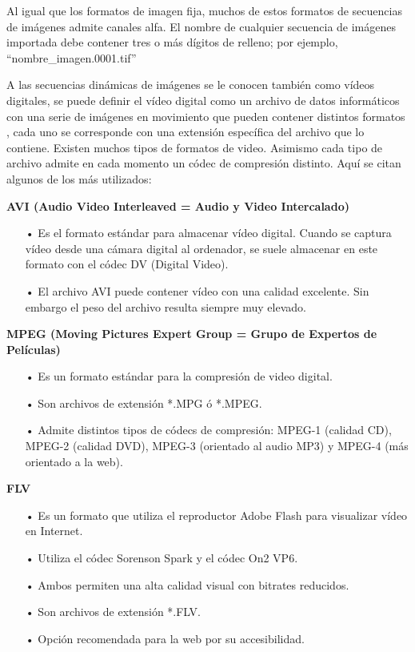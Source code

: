 Al igual que los formatos de imagen fija, muchos de estos formatos de secuencias de imágenes admite canales alfa. El nombre de cualquier secuencia de imágenes importada debe contener tres o más dígitos de relleno; por ejemplo, “nombre{\_}imagen.0001.tif”

A las secuencias dinámicas de imágenes se le conocen también como vídeos digitales, se puede definir el vídeo digital como un archivo de datos informáticos con una serie de imágenes en movimiento que pueden contener distintos formatos , cada uno se corresponde con una extensión específica del archivo que lo contiene. Existen muchos tipos de formatos de video. Asimismo cada tipo de archivo admite en cada momento un códec de compresión distinto. Aquí se citan algunos de los más utilizados: 

{\bf AVI (Audio Video Interleaved = Audio y Video Intercalado)} \vskip 0.1cm

\begin{itemize}
\item[•] Es el formato estándar para almacenar vídeo digital. Cuando se captura vídeo desde una cámara digital al ordenador, se suele almacenar en este formato con el códec DV (Digital Video).
\item[•] El archivo AVI puede contener vídeo con una calidad excelente. Sin embargo el peso del archivo resulta siempre muy elevado.
\end{itemize}

{\bf MPEG (Moving Pictures Expert Group = Grupo de Expertos de Películas)} \vskip 0.1cm

\begin{itemize}
\item[•] Es un formato estándar para la compresión de video digital.
\item[•] Son archivos de extensión *.MPG ó *.MPEG.
\item[•] Admite distintos tipos de códecs de compresión: MPEG-1 (calidad CD), MPEG-2 (calidad DVD), MPEG-3 (orientado al audio MP3) y MPEG-4 (más orientado a la web).
\end{itemize}

{\bf FLV} \vskip 0.1cm

\begin{itemize}
\item[•] Es un formato que utiliza el reproductor Adobe Flash para visualizar vídeo en Internet.
\item[•] Utiliza el códec Sorenson Spark y el códec On2 VP6.
\item[•] Ambos permiten una alta calidad visual con bitrates reducidos.
\item[•] Son archivos de extensión *.FLV.
\item[•] Opción recomendada para la web por su accesibilidad.
\end{itemize}



